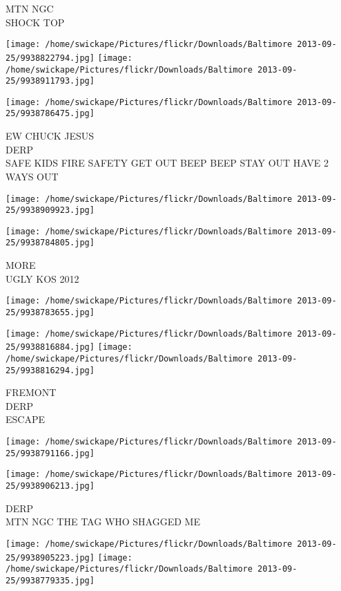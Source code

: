 \documentclass[10pt,letterpaper]{article}
\begin{document}
MTN NGC\\
SHOCK TOP
\pagebreak

\texttt{[image: /home/swickape/Pictures/flickr/Downloads/Baltimore 2013-09-25/9938822794.jpg]}
\texttt{[image: /home/swickape/Pictures/flickr/Downloads/Baltimore 2013-09-25/9938911793.jpg]}

\vspace{0.25in}
\texttt{[image: /home/swickape/Pictures/flickr/Downloads/Baltimore 2013-09-25/9938786475.jpg]}

EW CHUCK JESUS\\
DERP\\
SAFE KIDS FIRE SAFETY GET OUT BEEP BEEP STAY OUT HAVE 2 WAYS OUT
\pagebreak

\texttt{[image: /home/swickape/Pictures/flickr/Downloads/Baltimore 2013-09-25/9938909923.jpg]}

\vspace{0.25in}
\texttt{[image: /home/swickape/Pictures/flickr/Downloads/Baltimore 2013-09-25/9938784805.jpg]}

MORE\\
UGLY KOS 2012
\pagebreak

\texttt{[image: /home/swickape/Pictures/flickr/Downloads/Baltimore 2013-09-25/9938783655.jpg]}

\vspace{0.25in}
\texttt{[image: /home/swickape/Pictures/flickr/Downloads/Baltimore 2013-09-25/9938816884.jpg]}
\texttt{[image: /home/swickape/Pictures/flickr/Downloads/Baltimore 2013-09-25/9938816294.jpg]}

FREMONT\\
DERP\\
ESCAPE
\pagebreak

\texttt{[image: /home/swickape/Pictures/flickr/Downloads/Baltimore 2013-09-25/9938791166.jpg]}

\vspace{0.25in}
\texttt{[image: /home/swickape/Pictures/flickr/Downloads/Baltimore 2013-09-25/9938906213.jpg]}

DERP\\
MTN NGC THE TAG WHO SHAGGED ME
\pagebreak

\texttt{[image: /home/swickape/Pictures/flickr/Downloads/Baltimore 2013-09-25/9938905223.jpg]}
\texttt{[image: /home/swickape/Pictures/flickr/Downloads/Baltimore 2013-09-25/9938779335.jpg]}
\end{document}
